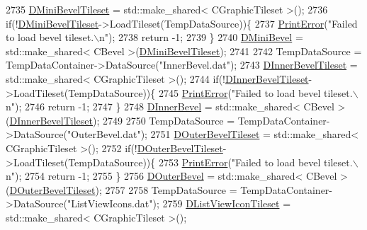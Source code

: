\begin{DoxyCode}
2735     \hyperlink{classCApplicationData_a74527a373eef061540615e61928f9706}{DMiniBevelTileset} = std::make\_shared< CGraphicTileset >();
2736     \textcolor{keywordflow}{if}(!\hyperlink{classCApplicationData_a74527a373eef061540615e61928f9706}{DMiniBevelTileset}->LoadTileset(TempDataSource))\{
2737         \hyperlink{Debug_8h_a2ed825eefefe35baf59a93a8c641323d}{PrintError}(\textcolor{stringliteral}{"Failed to load bevel tileset.\(\backslash\)n"});
2738         \textcolor{keywordflow}{return} -1;
2739     \}        
2740     \hyperlink{classCApplicationData_ad6718b216878d9fe05b26cd24b89c6ee}{DMiniBevel} = std::make\_shared< CBevel >(\hyperlink{classCApplicationData_a74527a373eef061540615e61928f9706}{DMiniBevelTileset});
2741     
2742     TempDataSource = TempDataContainer->DataSource(\textcolor{stringliteral}{"InnerBevel.dat"});
2743     \hyperlink{classCApplicationData_ae62d58d93397422437d8f50acfca23e6}{DInnerBevelTileset} = std::make\_shared< CGraphicTileset >();
2744     \textcolor{keywordflow}{if}(!\hyperlink{classCApplicationData_ae62d58d93397422437d8f50acfca23e6}{DInnerBevelTileset}->LoadTileset(TempDataSource))\{
2745         \hyperlink{Debug_8h_a2ed825eefefe35baf59a93a8c641323d}{PrintError}(\textcolor{stringliteral}{"Failed to load bevel tileset.\(\backslash\)n"});
2746         \textcolor{keywordflow}{return} -1;
2747     \}        
2748     \hyperlink{classCApplicationData_a29a687c44dceb9e87a56d96612d59ab5}{DInnerBevel} = std::make\_shared< CBevel >(\hyperlink{classCApplicationData_ae62d58d93397422437d8f50acfca23e6}{DInnerBevelTileset});
2749     
2750     TempDataSource = TempDataContainer->DataSource(\textcolor{stringliteral}{"OuterBevel.dat"});
2751     \hyperlink{classCApplicationData_ac1ebf4e2d6c8a445c7e8de643a348093}{DOuterBevelTileset} = std::make\_shared< CGraphicTileset >();
2752     \textcolor{keywordflow}{if}(!\hyperlink{classCApplicationData_ac1ebf4e2d6c8a445c7e8de643a348093}{DOuterBevelTileset}->LoadTileset(TempDataSource))\{
2753         \hyperlink{Debug_8h_a2ed825eefefe35baf59a93a8c641323d}{PrintError}(\textcolor{stringliteral}{"Failed to load bevel tileset.\(\backslash\)n"});
2754         \textcolor{keywordflow}{return} -1;
2755     \}        
2756     \hyperlink{classCApplicationData_abc2b04aa05148da81145ff6d6bc2bf01}{DOuterBevel} = std::make\_shared< CBevel >(\hyperlink{classCApplicationData_ac1ebf4e2d6c8a445c7e8de643a348093}{DOuterBevelTileset});
2757     
2758     TempDataSource = TempDataContainer->DataSource(\textcolor{stringliteral}{"ListViewIcons.dat"});
2759     \hyperlink{classCApplicationData_ab00db57ca7c624d026ed1fc108bc5b38}{DListViewIconTileset} = std::make\_shared< CGraphicTileset >();

\end{DoxyCode}
